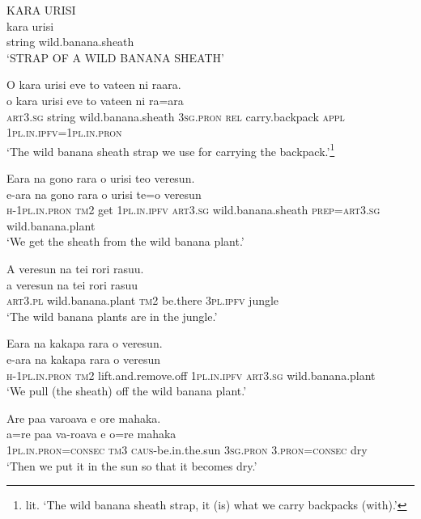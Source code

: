 \ea\label{ex:text7-88}
KARA URISI\\
\gll kara	urisi\\
     string	wild.banana.sheath\\
\glt `STRAP OF A WILD BANANA SHEATH'
\z

\ea\label{ex:text7-89}
O kara urisi eve to vateen ni raara.\\
\gll o	kara	urisi	eve	to	vateen	ni	ra=ara\\
     \textsc{art}3.\textsc{sg}	string	wild.banana.sheath	3\textsc{sg}.\textsc{pron}	\textsc{rel}	carry.backpack	\textsc{appl}	1\textsc{pl}.\textsc{in}.\textsc{ipfv}=1\textsc{pl}.\textsc{in}.\textsc{pron}\\
\glt `The wild banana sheath strap we use for carrying the backpack.'\footnote{lit. `The wild banana sheath strap, it (is) what we carry backpacks (with).'}
\z

\ea\label{ex:text7-90}
Eara na gono rara o urisi teo veresun.\\
\gll e-ara	na	gono	rara	o	urisi	te=o	veresun\\
     \textsc{h}-1\textsc{pl}.\textsc{in}.\textsc{pron}	\textsc{tm}2	get	1\textsc{pl}.\textsc{in}.\textsc{ipfv}	\textsc{art}3.\textsc{sg}	wild.banana.sheath	\textsc{prep}=\textsc{art}3.\textsc{sg}	wild.banana.plant\\
\glt `We get the sheath from the wild banana plant.'
\z

\ea\label{ex:text7-91}
A veresun na tei rori rasuu.\\
\gll a	veresun	na	tei	rori	rasuu\\
     \textsc{art}3.\textsc{pl}	wild.banana.plant	\textsc{tm}2	be.there	3\textsc{pl}.\textsc{ipfv}	jungle\\
\glt `The wild banana plants are in the jungle.'
\z

\ea\label{ex:text7-92}
Eara na kakapa rara o veresun.\\
\gll e-ara	na	kakapa	rara	o	veresun\\
     \textsc{h}-1\textsc{pl}.\textsc{in}.\textsc{pron}	\textsc{tm}2	lift.and.remove.off	1\textsc{pl}.\textsc{in}.\textsc{ipfv}	\textsc{art}3.\textsc{sg}	wild.banana.plant\\
\glt `We pull (the sheath) off the wild banana plant.'
\z

\ea\label{ex:text7-93}
Are paa varoava e ore mahaka.\\
\gll a=re	paa	va-roava	e	o=re	mahaka\\
     1\textsc{pl}.\textsc{in}.\textsc{pron}=\textsc{consec}	\textsc{tm}3	\textsc{caus}-be.in.the.sun	3\textsc{sg}.\textsc{pron}	3.\textsc{pron}=\textsc{consec}	dry\\
\glt `Then we put it in the sun so that it becomes dry.'
\z

